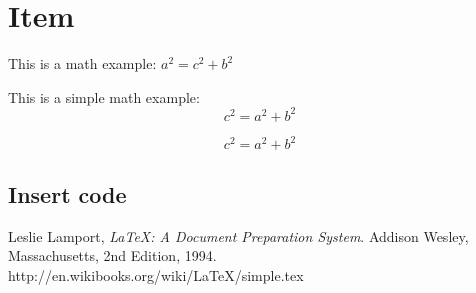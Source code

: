 \documentclass{article}%
\begin{document}
\section{Item}
\label{sec:item}

This is a math example: $a^2=c^2+b^2$

This is a simple math example: $$c^2=a^2+b^2$$


\begin{equation}
  \label{eq:1}
  c^2 = a^2 + b^2
\end{equation}

\subsection{Insert code}
\label{sec:insert-code}

\begin{thebibliography}{99}
 Leslie Lamport, \emph{\LaTeX: A Document
    Preparation System}.  Addison Wesley, Massachusetts, 2nd Edition,
  1994.
  http://en.wikibooks.org/wiki/LaTeX/simple.tex
\end{thebibliography}
\end{document}
